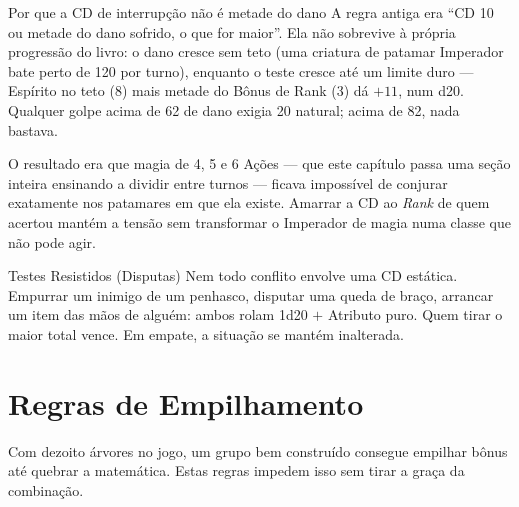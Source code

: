 \begin{nota}{Por que a CD de interrupção não é metade do dano}
    A regra antiga era \enquote{CD 10 ou metade do dano sofrido, o que for maior}. Ela não
    sobrevive à própria progressão do livro: o dano cresce sem teto (uma criatura de patamar
    Imperador bate perto de 120 por turno), enquanto o teste cresce até um limite duro ---
    Espírito no teto (8) mais metade do Bônus de Rank (3) dá $+11$, num d20. Qualquer golpe
    acima de 62 de dano exigia 20 natural; acima de 82, nada bastava.

    \medskip
    O resultado era que magia de 4, 5 e 6 Ações --- que este capítulo passa uma seção inteira
    ensinando a dividir entre turnos --- ficava impossível de conjurar exatamente nos
    patamares em que ela existe. Amarrar a CD ao \emph{Rank} de quem acertou mantém a tensão
    sem transformar o Imperador de magia numa classe que não pode agir.
\end{nota}

\begin{nota}{Testes Resistidos (Disputas)}
    Nem todo conflito envolve uma CD estática. Empurrar um inimigo de um penhasco, disputar
    uma queda de braço, arrancar um item das mãos de alguém: ambos rolam 1d20 $+$ Atributo
    puro. Quem tirar o maior total vence. Em empate, a situação se mantém inalterada.
\end{nota}

\section{Regras de Empilhamento}

Com dezoito árvores no jogo, um grupo bem construído consegue empilhar bônus até quebrar a
matemática. Estas regras impedem isso sem tirar a graça da combinação.

